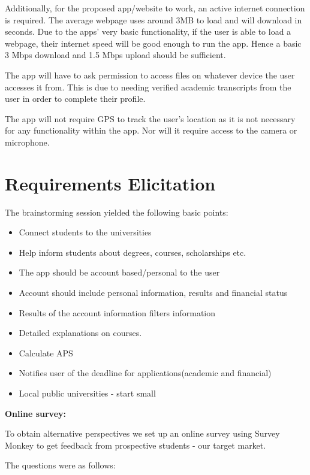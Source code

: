 \documentclass[a4paper, 12pt]{article}
\begin{document}
Additionally, for the proposed app/website to work, an active internet connection is required. The average webpage uses around 3MB to load and will download in seconds. Due to the apps’ very basic functionality, if the user is able to load a webpage, their internet speed will be good enough to run the app. Hence a basic 3 Mbps download and 1.5 Mbps upload should be sufficient. 

The app will have to ask permission to access files on whatever device the user accesses it from. This is due to needing verified academic transcripts from the user in order to complete their profile. 

The app will not require GPS to track the user’s location as it is not necessary for any functionality within the app. Nor will it require access to the camera or microphone.  
 
\newpage
\section{Requirements Elicitation}

The brainstorming session yielded the following basic points: 

\begin{itemize}
\item Connect students to the universities
\item Help inform students about degrees, courses, scholarships etc.
\item The app should be account based/personal to the user 
\item Account should include personal information, results and financial status
\item Results of the account information filters information 
\item Detailed explanations on courses.
\item Calculate APS 
\item Notifies user of the deadline for applications(academic and financial)
\item Local public universities - start small
\end{itemize}

\textbf{Online survey:}

To obtain alternative perspectives we set up an online survey using Survey Monkey to get feedback from prospective students - our target market.

The questions were as follows:
\end{document}
